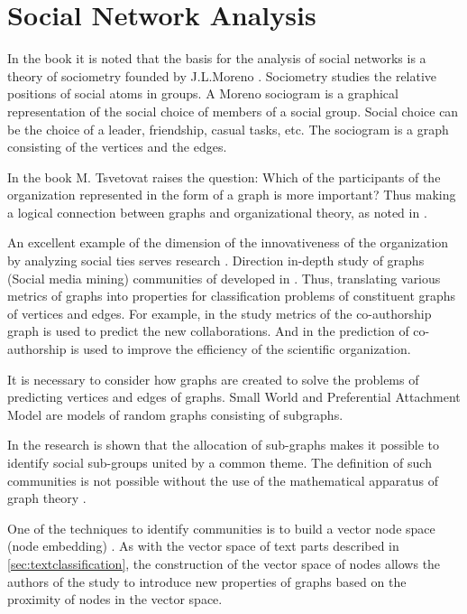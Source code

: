 \documentclass[12pt]{report}
\theoremstyle{definition}
\begin{document}
\section{Social Network Analysis}
In the book \cite{de2018exploratory} it is noted that the basis for the analysis of social networks is a theory of sociometry founded by J.L.Moreno \cite{moreno1953shall}. 
Sociometry studies the relative positions of social atoms in groups. 
A Moreno sociogram is a graphical representation of the social choice of members of a social group.
Social choice can be the choice of a leader, friendship, casual tasks, etc.  
The sociogram is a graph consisting of the vertices and the edges.

In the book \cite{tsvetovat2011social} M. Tsvetovat raises the question:
Which of the participants of the organization represented in the form of a graph is more important? 
Thus making a logical connection between graphs and organizational theory, as noted in \cite{atherley2015model}.

An excellent example of the dimension of the innovativeness of the organization by analyzing social ties serves research \cite{porter2018mapping}.
Direction in-depth study of graphs (Social media mining) communities of developed in \cite{kurmukov2016classification, zafarani2014social}.
Thus, translating various metrics of graphs into properties for classification problems of constituent graphs of vertices and edges. 
For example, in the study \cite{makarov2016co} metrics of the co-authorship graph is used to predict the new collaborations.
And in \cite{makarov2018recommending} the prediction of co-authorship is used to improve the efficiency of the scientific organization.

It is necessary to consider how graphs are created to solve the problems of predicting vertices and edges of graphs.
Small World \cite{watts1998collective} and Preferential Attachment Model \cite{barabasi1999emergence} are models of random graphs consisting of subgraphs.

In the research\cite{fortunato2010community}  is shown that the allocation of sub-graphs makes it possible to identify social sub-groups united by a common theme. 
The definition of such communities is not possible without the use of the mathematical apparatus of graph theory \cite{lancichinetti2009community}.

One of the techniques to identify communities is to build a vector node space (node embedding) \cite{zheng2016node}. 
As with the vector space of text parts described in \ref{sec:textclassification}, the construction of the vector space of nodes allows the authors of the study \cite{liu2017semantic} to introduce new properties of graphs based on the proximity of nodes in the vector space.
\end{document}
